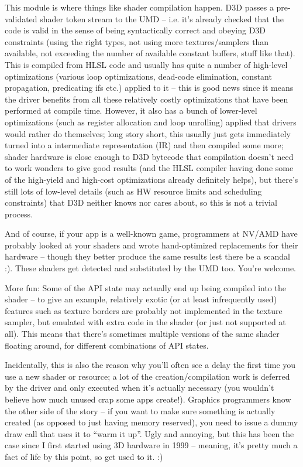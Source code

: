 \documentclass[12pt]{article}
\begin{document}
This module is where things like shader compilation happen.
D3D passes a pre-validated shader token stream to the UMD – i.e. it’s already checked that the code is valid in the sense of being syntactically correct and obeying D3D constraints (using the right types, not using more textures/samplers than available, not exceeding the number of available constant buffers, stuff like that).
This is compiled from HLSL code and usually has quite a number of high-level optimizations (various loop optimizations, dead-code elimination, constant propagation, predicating ifs etc.) applied to it – this is good news since it means the driver benefits from all these relatively costly optimizations that have been performed at compile time.
However, it also has a bunch of lower-level optimizations (such as register allocation and loop unrolling) applied that drivers would rather do themselves; long story short, this usually just gets immediately turned into a intermediate representation (IR) and then compiled some more; shader hardware is close enough to D3D bytecode that compilation doesn’t need to work wonders to give good results (and the HLSL compiler having done some of the high-yield and high-cost optimizations already definitely helps), but there’s still lots of low-level details (such as HW resource limits and scheduling constraints) that D3D neither knows nor cares about, so this is not a trivial process.

And of course, if your app is a well-known game, programmers at NV/AMD have probably looked at your shaders and wrote hand-optimized replacements for their hardware – though they better produce the same results lest there be a scandal :).
These shaders get detected and substituted by the UMD too. You’re welcome.

More fun: Some of the API state may actually end up being compiled into the shader – to give an example, relatively exotic (or at least infrequently used) features such as texture borders are probably not implemented in the texture sampler, but emulated with extra code in the shader (or just not supported at all).
This means that there’s sometimes multiple versions of the same shader floating around, for different combinations of API states.

Incidentally, this is also the reason why you’ll often see a delay the first time you use a new shader or resource; a lot of the creation/compilation work is deferred by the driver and only executed when it’s actually necessary (you wouldn’t believe how much unused crap some apps create!).
Graphics programmers know the other side of the story – if you want to make sure something is actually created (as opposed to just having memory reserved), you need to issue a dummy draw call that uses it to “warm it up”.
Ugly and annoying, but this has been the case since I first started using 3D hardware in 1999 – meaning, it’s pretty much a fact of life by this point, so get used to it. :)
\end{document}
